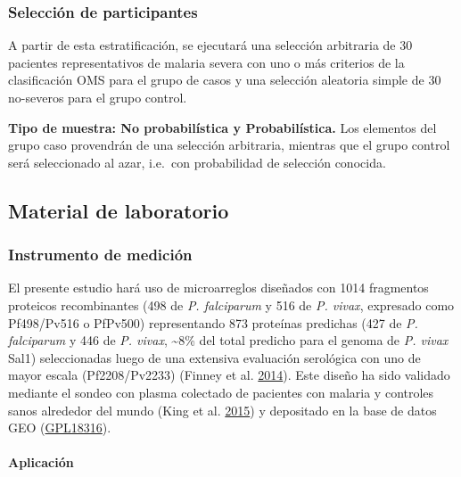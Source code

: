 \documentclass[
  a4paper]{article}
\let\oldparagraph\paragraph
\renewcommand{\paragraph}[1]{\oldparagraph{#1}\mbox{}}
\begin{document}
\hypertarget{selecciuxf3n-de-participantes}{%
\subsubsection{Selección de
participantes}\label{selecciuxf3n-de-participantes}}

A partir de esta estratificación, se ejecutará una selección arbitraria
de 30 pacientes representativos de malaria severa con uno o más
criterios de la clasificación OMS para el grupo de casos y una selección
aleatoria simple de 30 no-severos para el grupo control.

\textbf{Tipo de muestra: No probabilística y Probabilística.} Los
elementos del grupo caso provendrán de una selección arbitraria,
mientras que el grupo control será seleccionado al azar, i.e.~con
probabilidad de selección conocida.

\hypertarget{material-de-laboratorio}{%
\subsection{Material de laboratorio}\label{material-de-laboratorio}}

\hypertarget{instrumento-de-mediciuxf3n}{%
\subsubsection{Instrumento de
medición}\label{instrumento-de-mediciuxf3n}}

El presente estudio hará uso de microarreglos diseñados con 1014
fragmentos proteicos recombinantes (498 de \emph{P. falciparum} y 516 de
\emph{P. vivax}, expresado como Pf498/Pv516 o PfPv500) representando 873
proteínas predichas (427 de \emph{P. falciparum} y 446 de \emph{P.
vivax}, \textasciitilde{}8\% del total predicho para el genoma de
\emph{P. vivax} Sal1) seleccionadas luego de una extensiva evaluación
serológica con uno de mayor escala (Pf2208/Pv2233) (Finney et al.
\protect\hyperlink{ref-Finney2014}{2014}). Este diseño ha sido validado
mediante el sondeo con plasma colectado de pacientes con malaria y
controles sanos alrededor del mundo (King et al.
\protect\hyperlink{ref-King2015FOC}{2015}) y depositado en la base de
datos GEO
(\href{https://www.ncbi.nlm.nih.gov/geo/query/acc.cgi?acc=GPL18316}{GPL18316}).

\hypertarget{aplicaciuxf3n}{%
\paragraph{Aplicación}\label{aplicaciuxf3n}}
\end{document}
